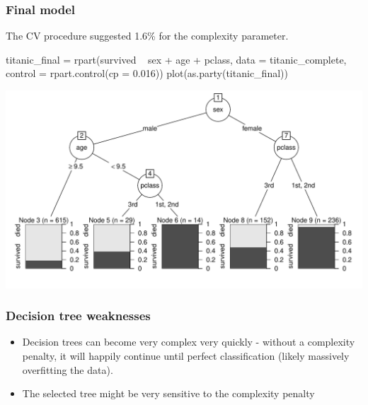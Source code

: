 \documentclass[a4paper]{article}
\begin{document}
\subsubsection{Final model}
The CV procedure suggested 1.6\% for the complexity parameter.
\begin{Schunk}
\begin{Sinput}
titanic_final = rpart(survived ~ sex + age + pclass, data = titanic_complete, 
                      control = rpart.control(cp = 0.016))
plot(as.party(titanic_final))
\end{Sinput}


{\centering \includegraphics[width=0.95\linewidth]{figure/listings-unnamed-chunk-446-1} 

}

\end{Schunk}
\subsubsection{Decision tree weaknesses}
\begin{itemize}
	\item Decision trees can become very complex very quickly - without a complexity penalty, it will happily continue until perfect classification (likely massively overfitting the data).
	\item The selected tree might be very sensitive to the complexity penalty
\end{itemize}
\end{document}
